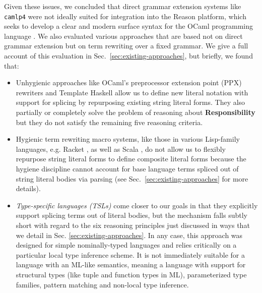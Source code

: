 \documentclass[acmsmall]{acmart}
\newcommand{\li}[1]{\lstinline[basicstyle=\ttfamily\fontsize{9pt}{1em}\selectfont]{#1}}
\begin{document}
Given these issues, we concluded that direct grammar extension systems like \li{camlp4} were not ideally suited for integration into the Reason platform, which seeks to develop a clear and modern surface syntax for the OCaml programming language \cite{reason-what}. We also evaluated various approaches that are based not on direct grammar extension but on term rewriting over a fixed grammar. We give a full account of this evaluation in Sec.~\ref{sec:existing-approaches}, but briefly, we found that:
\begin{itemize}[leftmargin=15px]
\item Unhygienic approaches like OCaml's preprocessor extension point (PPX) rewriters \cite{ocaml-manual} and Template Haskell \cite{SheardPeytonJones:Haskell-02,mainland2007s} allow us to define new literal notation with support for splicing by repurposing existing string literal forms. They also partially or completely solve the problem of reasoning about \textbf{Responsibility} but they do not satisfy the remaining five reasoning criteria.
\item Hygienic term rewriting macro systems, like those in various Lisp-family languages, 
e.g. Racket \cite{Flatt:2012:CLR:2063176.2063195}, as well as Scala \cite{ScalaMacros2013}, do not allow us to flexibly repurpose string literal forms to define composite literal forms because the hygiene discipline cannot account for base language terms spliced out of string literal bodies via parsing (see Sec.~\ref{sec:existing-approaches} for more details). %
\item \emph{Type-specific languages (TSLs)} \cite{TSLs} come closer to our goals in that they explicitly support splicing terms out of literal bodies, but the mechanism falls subtly short with regard to the six reasoning principles just discussed in ways that we detail in Sec. \ref{sec:existing-approaches}. In any case, this approach was designed for simple nominally-typed languages and relies critically on a particular local type inference scheme. It is not immediately suitable for a language with an ML-like semantics, meaning a language with support for structural types (like tuple and function types in ML), parameterized type families, pattern matching and non-local type inference.
\end{itemize}
\end{document}
